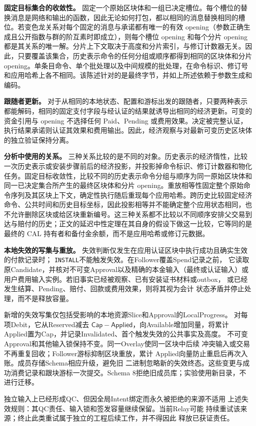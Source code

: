 \noindent\textbf{固定目标集合的收敛性。}
固定一个原始区块体和一组已决定槽位。每个槽位的替换消息是网络和输出的函数，因此无论如何打包，都以相同的消息替换相同的槽位。若变色龙关系对每个固定的消息与承诺都有唯一的有效 opening（参数正确生成且公开指数与群的阶互素时即成立），则每个槽位 opening 和每个分片 opening 都是其关系的唯一解。分片上下文取决于高度和分片索引，与修订计数器无关。因此，只要覆盖该集合，历史表示命令的任何分组或顺序都得到相同的区块体和分片 opening。单条目命令、单个批处理以及中间规模的批处理，在命令标识、修订号和应用哈希上各不相同。该陈述针对的是最终字节，并如上所述依赖于参数生成和编码。

\noindent\textbf{跟随者更新。}
对于从相同的本地状态、配置和游标出发的跟随者，只要两种表示都能解码，相同的固定支付字段与经认证的结果就诱导出相同的经济更新。可变的资金引用与 opening 不选择任何 Paid、Pending 或费用效果。决定被完整认证，执行结果承诺则认证其效果和费用输出。因此，经济观察与对最新可变历史区块体的独立验证保持分离。

\noindent\textbf{分析中使用的关系。}
三种关系比较的是不同的对象。历史表示的经济惰性，比较一次历史表示或安装步骤前后的经济投影，并投影掉命令标识、修订计数器和物化任务。固定目标收敛性，比较不同的历史表示命令分组与顺序为同一原始区块体和同一已决定集合所产生的最终区块体和分片 opening。重放相等性固定整个原始命令序列及其区块上下文，确定性执行随后重现每个应用哈希。跨历史比较固定经济命令、公共时间和历史目标坐标，因此投影相等并不能确定整个应用状态相同，也不允许删除区块或给区块重新编号。这三种关系都不比较以不同顺序安排父交易到达与赔付的历史；正文的延迟中性定理在其自身的假设下做这一比较，它等同的是最终的 CAL 持有者和备付金余额，而不是应用哈希或修订元数据。

\noindent\textbf{本地失效的写集与重放。}
失效判断仅发生在应用认证区块中执行成功且确实生效的付款记录时；
\texttt{INSTALL}不能触发失效。在Follower覆盖Spend记录之前，
它读取原Candidate，并核对不可变Approval以及精确的本金输入（最终或认证输入）或
用户费用输入实例。若旧事实已经被观察、已有安装证书材料或outbox，
或已经发生结算、Pending、赔付、回款或费用效果，则将其视为会计
状态矛盾并停止处理，而不是释放容量。

新增的失效写集仅包括受影响的本地资源Slice和Approval的LocalProgress。
对每项Debit，它从Reserved减去
$\mathsf{Cap}-\mathsf{Applied}$，向Available增加同量，将累计
Applied置为Cap，并记录Invalidated、首个触发失效的公共事实及高度。
不可变Approval和其他输入锁保持不变。同一Overlay使同一区块中后续
冲突输入或交易不再重复回收；Follower游标抑制区块重放，累计
Applied向量防止重启后再次入账。成员存储Schema相应升级，避免旧
二进制忽略新的失效终态。这些变更与成功消费记录和跟块游标一次提交。Schema 8拒绝旧成员库；实验使用新目录，不进行迁移。

独立输入上已经形成QC、但因全局Intent绑定而永久被拒绝的来源不适用
上述失效规则：其QC责任、输入锁和签发容量继续保留。当前Relay可能
持续重试该来源；终止此类重试属于独立的工程后续工作，并不得因此
释放已获证责任。
